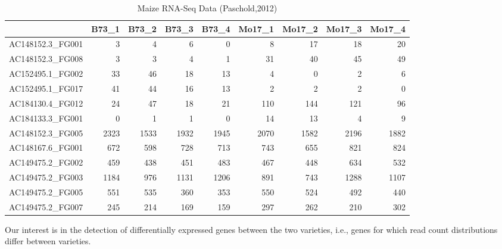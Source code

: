 \begin{table}[ht]
\centering
\begin{tabular}{|r|r|r|r|r|r|r|r|r|}
  \hline
 & B73\_1 & B73\_2 & B73\_3 & B73\_4 & Mo17\_1 & Mo17\_2 & Mo17\_3 & Mo17\_4 \\ 
  \hline
AC148152.3\_FG001 &   3 &   4 &   6 &   0 &   8 &  17 &  18 &  20 \\ 
  AC148152.3\_FG008 &   3 &   3 &   4 &   1 &  31 &  40 &  45 &  49 \\ 
  AC152495.1\_FG002 &  33 &  46 &  18 &  13 &   4 &   0 &   2 &   6 \\ 
  AC152495.1\_FG017 &  41 &  44 &  16 &  13 &   2 &   2 &   2 &   0 \\ 
  AC184130.4\_FG012 &  24 &  47 &  18 &  21 & 110 & 144 & 121 &  96 \\ 
  AC184133.3\_FG001 &   0 &   1 &   1 &   0 &  14 &  13 &   4 &   9 \\ 
   \hline
   \hline
AC148152.3\_FG005 & 2323 & 1533 & 1932 & 1945 & 2070 & 1582 & 2196 & 1882 \\ 
  AC148167.6\_FG001 & 672 & 598 & 728 & 713 & 743 & 655 & 821 & 824 \\ 
  AC149475.2\_FG002 & 459 & 438 & 451 & 483 & 467 & 448 & 634 & 532 \\ 
  AC149475.2\_FG003 & 1184 & 976 & 1131 & 1206 & 891 & 743 & 1288 & 1107 \\ 
  AC149475.2\_FG005 & 551 & 535 & 360 & 353 & 550 & 524 & 492 & 440 \\ 
  AC149475.2\_FG007 & 245 & 214 & 169 & 159 & 297 & 262 & 210 & 302 \\ 
   \hline
   
\end{tabular}
\caption{Maize RNA-Seq Data (Paschold,2012)}
\label{tab:RNA-Seq Data}
\end{table}

Our interest is in the detection of differentially expressed genes between the two varieties, i.e., genes for which read count distributions differ between varieties. 

